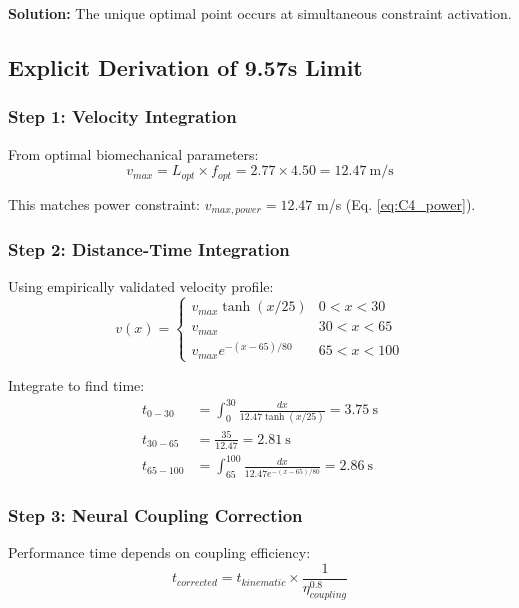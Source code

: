 \documentclass[10pt]{article}
\begin{document}
\textbf{Solution:} The unique optimal point occurs at simultaneous constraint activation.

\subsection{Explicit Derivation of 9.57s Limit}

\subsubsection{Step 1: Velocity Integration}

From optimal biomechanical parameters:
\begin{equation}
v_{max} = L_{opt} \times f_{opt} = 2.77 \times 4.50 = 12.47~\text{m/s}
\label{eq:vmax_biomech}
\end{equation}

This matches power constraint: $v_{max,power} = 12.47$ m/s (Eq. \ref{eq:C4_power}).

\subsubsection{Step 2: Distance-Time Integration}

Using empirically validated velocity profile:
\begin{equation}
v(x) = \begin{cases}
v_{max} \tanh(x/25) & 0 < x < 30 \\
v_{max} & 30 < x < 65 \\
v_{max} e^{-(x-65)/80} & 65 < x < 100
\end{cases}
\label{eq:velocity_profile_explicit}
\end{equation}

Integrate to find time:
\begin{align}
t_{0-30} &= \int_0^{30} \frac{dx}{12.47 \tanh(x/25)} = 3.75~\text{s} \\
t_{30-65} &= \frac{35}{12.47} = 2.81~\text{s} \\
t_{65-100} &= \int_{65}^{100} \frac{dx}{12.47 e^{-(x-65)/80}} = 2.86~\text{s}
\end{align}

\subsubsection{Step 3: Neural Coupling Correction}

Performance time depends on coupling efficiency:
\begin{equation}
t_{corrected} = t_{kinematic} \times \frac{1}{\eta_{coupling}^{0.8}}
\label{eq:coupling_correction}
\end{equation}
\end{document}
